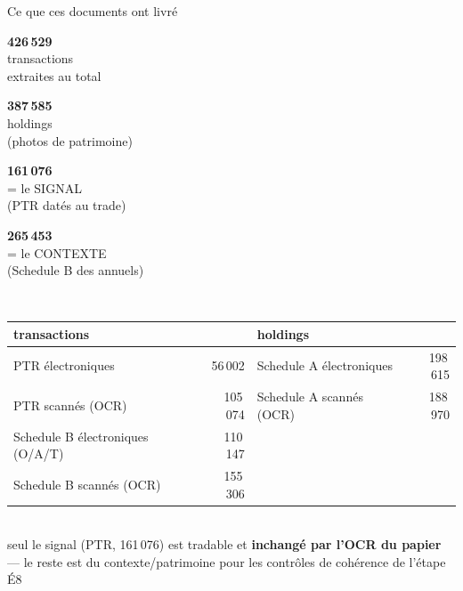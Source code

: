 \documentclass[11pt,aspectratio=169]{beamer}
\newcommand{\tuile}[3]{%
  \begin{minipage}[t]{0.23\textwidth}\centering
    \colorbox{#1}{\parbox[c][21mm][c]{\dimexpr\linewidth-8pt}{\centering
      {\color{white}\Large\textbf{#2}}\\[0.6mm]
      {\color{white}\footnotesize #3}}}
  \end{minipage}}
\begin{document}
\begin{frame}{Ce que ces documents ont livré}
  \centering
  \tuile{helec}{426\,529}{transactions\\extraites au total}\hfill
  \tuile{dataC}{387\,585}{holdings\\(photos de patrimoine)}\hfill
  \tuile{okgreen}{161\,076}{= le SIGNAL\\(PTR datés au trade)}\hfill
  \tuile{grisC}{265\,453}{= le CONTEXTE\\(Schedule B des annuels)}\\[4mm]
  {\footnotesize\setlength{\tabcolsep}{8pt}
  \begin{tabular}{l r l r}
    \toprule
    \textbf{transactions} & & \textbf{holdings} & \\
    \midrule
    PTR électroniques & 56\,002 & Schedule A électroniques & 198\,615 \\
    PTR scannés (OCR) & 105\,074 & Schedule A scannés (OCR) & 188\,970 \\
    Schedule B électroniques (O/A/T) & 110\,147 & & \\
    Schedule B scannés (OCR) & 155\,306 & & \\
    \bottomrule
  \end{tabular}}\\[2.5mm]
  {\scriptsize\color{black!60} seul le signal (PTR, 161\,076) est tradable et
   \textbf{inchangé par l'OCR du papier} — le reste est du contexte/patrimoine pour
   les contrôles de cohérence de l'étape É8}
\end{frame}
\end{document}
